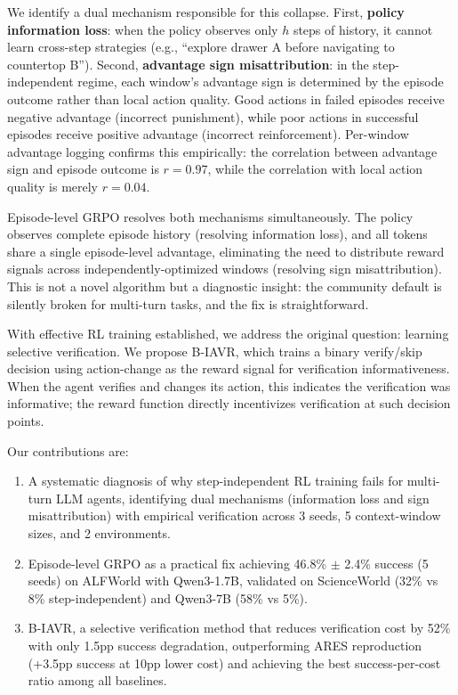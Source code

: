\documentclass[11pt]{article}
\begin{document}
We identify a dual mechanism responsible for this collapse. First, \textbf{policy information loss}: when the policy observes only $h$ steps of history, it cannot learn cross-step strategies (e.g., ``explore drawer A before navigating to countertop B''). Second, \textbf{advantage sign misattribution}: in the step-independent regime, each window's advantage sign is determined by the episode outcome rather than local action quality. Good actions in failed episodes receive negative advantage (incorrect punishment), while poor actions in successful episodes receive positive advantage (incorrect reinforcement). Per-window advantage logging confirms this empirically: the correlation between advantage sign and episode outcome is $r = 0.97$, while the correlation with local action quality is merely $r = 0.04$.

Episode-level GRPO resolves both mechanisms simultaneously. The policy observes complete episode history (resolving information loss), and all tokens share a single episode-level advantage, eliminating the need to distribute reward signals across independently-optimized windows (resolving sign misattribution). This is not a novel algorithm but a diagnostic insight: the community default is silently broken for multi-turn tasks, and the fix is straightforward.

With effective RL training established, we address the original question: learning selective verification. We propose B-IAVR, which trains a binary verify/skip decision using action-change as the reward signal for verification informativeness. When the agent verifies and changes its action, this indicates the verification was informative; the reward function directly incentivizes verification at such decision points.

Our contributions are:
\begin{enumerate}
\item A systematic diagnosis of why step-independent RL training fails for multi-turn LLM agents, identifying dual mechanisms (information loss and sign misattribution) with empirical verification across 3 seeds, 5 context-window sizes, and 2 environments.
\item Episode-level GRPO as a practical fix achieving 46.8\% $\pm$ 2.4\% success (5 seeds) on ALFWorld with Qwen3-1.7B, validated on ScienceWorld (32\% vs 8\% step-independent) and Qwen3-7B (58\% vs 5\%).
\item B-IAVR, a selective verification method that reduces verification cost by 52\% with only 1.5pp success degradation, outperforming ARES reproduction (+3.5pp success at 10pp lower cost) and achieving the best success-per-cost ratio among all baselines.
\end{enumerate}
\end{document}
